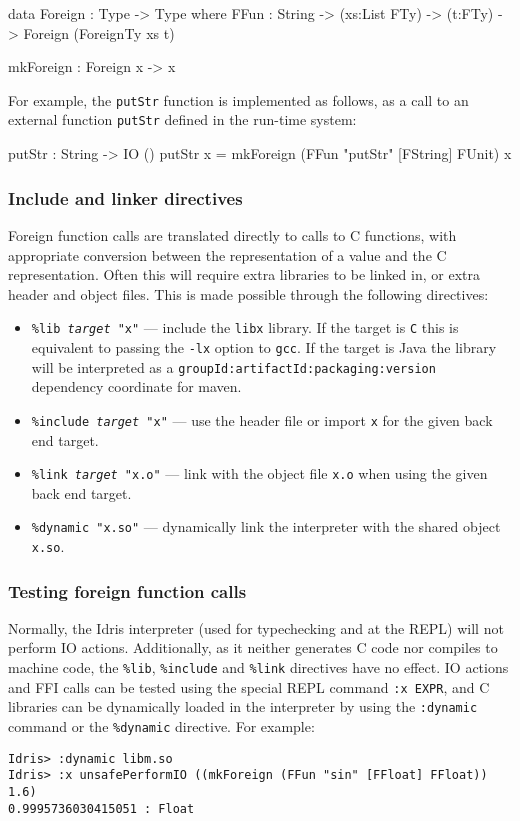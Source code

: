 \begin{code}
data Foreign : Type -> Type where
    FFun : String -> (xs:List FTy) -> (t:FTy) -> 
           Foreign (ForeignTy xs t)

mkForeign : Foreign x -> x
\end{code}

\noindent
For example, the \texttt{putStr} function is implemented as follows, as a call to  an external function \texttt{putStr} defined in the run-time system:

\begin{code}
putStr : String -> IO ()
putStr x = mkForeign (FFun "putStr" [FString] FUnit) x
\end{code}

\subsubsection*{Include and linker directives}

Foreign function calls are translated directly to calls to C functions, with appropriate conversion between the \Idris{} representation of a value and the C representation.
Often this will require extra libraries to be linked in, or extra header and object files.
This is made possible through the following directives:

\begin{itemize}
\item \texttt{\%lib \emph{target} "x"} --- include the \texttt{libx} library.
If the target is \texttt{C} this is equivalent to passing the \texttt{-lx} option to \texttt{gcc}.
If the target is Java the library will be interpreted as a \texttt{groupId\-:artifactId\-:packaging:version} dependency coordinate for maven.
\item \texttt{\%include \emph{target} "x"} --- use the header file or import \texttt{x} for the given back end target.
\item \texttt{\%link \emph{target} "x.o"} --- link with the object file \texttt{x.o} when using the given back end target.
\item \texttt{\%dynamic "x.so"} --- dynamically link the interpreter with the shared object \texttt{x.so}.
\end{itemize}

\subsubsection*{Testing foreign function calls}
Normally, the Idris interpreter (used for typechecking and at the REPL) will not perform IO actions.
Additionally, as it neither generates C code nor compiles to machine code, the \texttt{\%lib}, \texttt{\%include} and \texttt{\%link} directives have no effect.
IO actions and FFI calls can be tested using the special REPL command \texttt{:x EXPR}, and C libraries can be dynamically loaded in the interpreter by using the \texttt{:dynamic} command or the \texttt{\%dynamic} directive.
For example:

\begin{lstlisting}[style=stdout]
Idris> :dynamic libm.so
Idris> :x unsafePerformIO ((mkForeign (FFun "sin" [FFloat] FFloat)) 1.6)
0.9995736030415051 : Float
\end{lstlisting}

